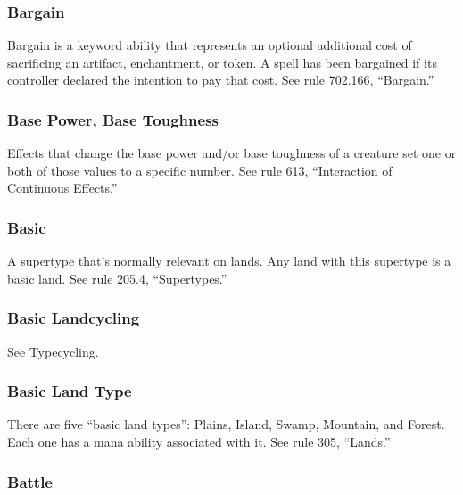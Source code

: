{\subsubsection*{Bargain}

Bargain is a keyword ability that represents an optional additional cost of sacrificing an artifact, enchantment, or token. A spell has been bargained if its controller declared the intention to pay that cost. See rule 702.166, “Bargain.”

\subsubsection*{Base Power, Base Toughness}

Effects that change the base power and/or base toughness of a creature set one or both of those values to a specific number. See rule 613, “Interaction of Continuous Effects.”

\subsubsection*{Basic}

A supertype that’s normally relevant on lands. Any land with this supertype is a basic land. See rule 205.4, “Supertypes.”

\subsubsection*{Basic Landcycling}

See Typecycling.

\subsubsection*{Basic Land Type}

There are five “basic land types”: Plains, Island, Swamp, Mountain, and Forest. Each one has a mana ability associated with it. See rule 305, “Lands.”

\subsubsection*{Battle}

}
